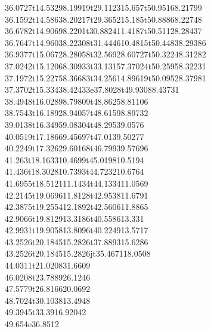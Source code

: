 \documentclass[draft]{article}
\makeatletter
\DeclareRobustCommand{\_}{%
  \ifmmode \nfss@text{\textunderscore}\else \BreakableUnderscore \fi}
\makeatother
\begin{document}
{{36.0727}t{14.5329}{8.19919}t{29.1123}{15.657}t{50.9516}{8.21799}\\%
{36.1592}t{14.5863}{8.20217}t{29.3652}{15.185}t{50.8886}{8.22748}\\%
{36.6782}t{14.9069}{8.2201}t{30.8824}{11.4187}t{50.5112}{8.28437}\\%
{36.7647}t{14.9603}{8.22308}t{31.4446}{10.4815}t{50.4483}{8.29386}\\%
{36.9377}t{15.0672}{8.28058}t{32.5692}{8.60727}t{50.3224}{8.31282}\\%
{37.0242}t{15.1206}{8.30933}t{33.1315}{7.37024}t{50.2595}{8.32231}\\%
{37.1972}t{15.2275}{8.36683}t{34.2561}{4.89619}t{50.0952}{8.37981}\\%
{37.3702}t{15.3343}{8.42433}e{37.8028}t{49.9308}{8.43731}\\%
{38.4948}t{16.0289}{8.79809}t{48.8625}{8.81106}\\%
{38.7543}t{16.1892}{8.94057}t{48.6159}{8.89732}\\%
{39.0138}t{16.3495}{9.08304}t{48.2953}{9.0576}\\%
{40.0519}t{17.1866}{9.45697}t{47.013}{9.50277}\\%
{40.2249}t{17.3262}{9.60168}t{46.7993}{9.57696}\\%
{41.263}t{18.1633}{10.4699}t{45.0198}{10.5194}\\%
{41.436}t{18.3028}{10.7393}t{44.7232}{10.6764}\\%
{41.6955}t{18.5121}{11.1434}t{44.1334}{11.0569}\\%
{42.2145}t{19.0696}{11.8128}t{42.9538}{11.6791}\\%
{42.3875}t{19.2554}{12.1892}t{42.5606}{11.8865}\\%
{42.9066}t{19.8129}{13.3186}t{40.5586}{13.331}\\%
{42.9931}t{19.9058}{13.8096}t{40.2249}{13.5717}\\%
{43.2526}t{20.1845}{15.2826}t{37.8893}{15.6286}\\%
{43.2526}t{20.1845}{15.2826}jt{35.4671}{18.0508}\\%
{44.0311}t{21.0208}{31.6609}\\%
{46.0208}t{23.7889}{26.1246}\\%
{47.5779}t{26.8166}{20.0692}\\%
{48.7024}t{30.1038}{13.4948}\\%
{49.3945}t{33.391}{6.92042}\\%
{49.654}e{36.8512}%
}

\end{document}
